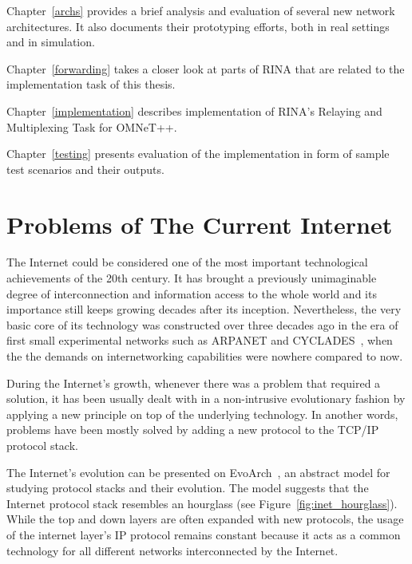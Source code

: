         Chapter~\ref{archs} provides a brief analysis and evaluation of several new network architectures. It also documents their prototyping efforts, both in real settings and in simulation.

        Chapter~\ref{forwarding} takes a closer look at parts of RINA that are related to the implementation task of this thesis.

        Chapter~\ref{implementation} describes implementation of RINA's Relaying and Multiplexing Task for OMNeT++.

        Chapter~\ref{testing} presents evaluation of the implementation in form of sample test scenarios and their outputs.


\chapter{Problems of The Current Internet}\label{problems}

    The Internet could be considered one of the most important technological achievements of the 20th century. It has brought a previously unimaginable degree of interconnection and information access to the whole world and its importance still keeps growing decades after its inception. Nevertheless, the very basic core of its technology was constructed over three decades ago in the era of first small experimental networks such as ARPANET and CYCLADES~\cite{Kurose}, when the the demands on internetworking capabilities were nowhere compared to now.

    During the Internet's growth, whenever there was a problem that required a solution, it has been usually dealt with in a non-intrusive evolutionary fashion by applying a new principle on top of the underlying technology. In another words, problems have been mostly solved by adding a new protocol to the TCP/IP protocol stack.

    The Internet's evolution can be presented on EvoArch~\cite{EvoArch}, an abstract model for studying protocol stacks and their evolution. The model suggests that the Internet protocol stack resembles an hourglass (see Figure~\ref{fig:inet_hourglass}). While the top and down layers are often expanded with new protocols, the usage of the internet layer's IP protocol remains constant because it acts as a common technology for all different networks interconnected by the Internet.

